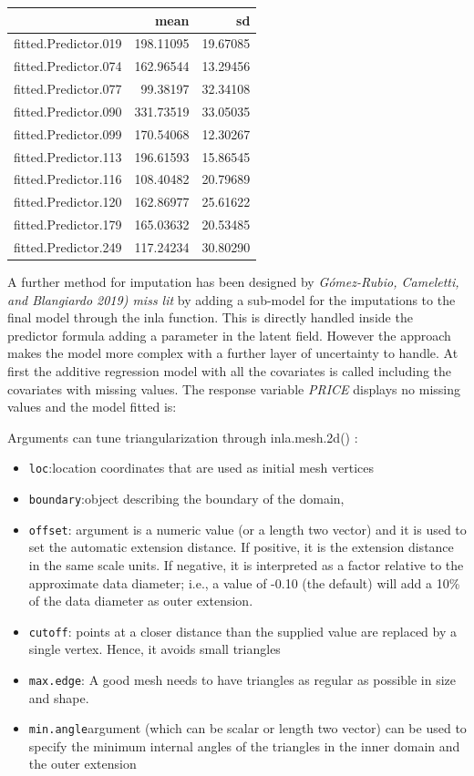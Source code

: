 \documentclass[
  12pt,
  a4paper,
  oneside]{book}
\newcommand{\passthrough}[1]{#1}
\providecommand{\tightlist}{%
  \setlength{\itemsep}{0pt}\setlength{\parskip}{0pt}}
\theoremstyle{definition}
\theoremstyle{definition}
\theoremstyle{definition}
\theoremstyle{remark}
\begin{document}
\begin{tabular}{lrr}
\toprule
  & mean & sd\\
\midrule
fitted.Predictor.019 & 198.11095 & 19.67085\\
fitted.Predictor.074 & 162.96544 & 13.29456\\
fitted.Predictor.077 & 99.38197 & 32.34108\\
fitted.Predictor.090 & 331.73519 & 33.05035\\
fitted.Predictor.099 & 170.54068 & 12.30267\\
\addlinespace
fitted.Predictor.113 & 196.61593 & 15.86545\\
fitted.Predictor.116 & 108.40482 & 20.79689\\
fitted.Predictor.120 & 162.86977 & 25.61622\\
fitted.Predictor.179 & 165.03632 & 20.53485\\
fitted.Predictor.249 & 117.24234 & 30.80290\\
\bottomrule
\end{tabular}

A further method for imputation has been designed by \emph{Gómez-Rubio, Cameletti, and Blangiardo 2019) miss lit} by adding a sub-model for the imputations to the final model through the inla function. This is directly handled inside the predictor formula adding a parameter in the latent field. However the approach makes the model more complex with a further layer of uncertainty to handle.
At first the additive regression model with all the covariates is called including the covariates with missing values. The response variable \emph{PRICE} displays no missing values and the model fitted is:

Arguments can tune triangularization through inla.mesh.2d() :

\begin{itemize}
\tightlist
\item
  \passthrough{\lstinline!loc!}:location coordinates that are used as initial mesh vertices
\item
  \passthrough{\lstinline!boundary!}:object describing the boundary of the domain,
\item
  \passthrough{\lstinline!offset!}: argument is a numeric value (or a length two vector) and it is used
  to set the automatic extension distance. If positive, it is the extension distance
  in the same scale units. If negative, it is interpreted as a factor relative to the
  approximate data diameter; i.e., a value of -0.10 (the default) will add a 10\%
  of the data diameter as outer extension.
\item
  \passthrough{\lstinline!cutoff!}: points at a closer distance than the supplied value are replaced by a single vertex. Hence, it avoids small triangles
\item
  \passthrough{\lstinline!max.edge!}: A good mesh needs to have triangles as regular as possible in size and shape.
\item
  \passthrough{\lstinline!min.angle!}argument (which can be scalar or length two vector) can be used to specify the minimum internal angles of the triangles in the inner domain and the outer extension
\end{itemize}
\end{document}
